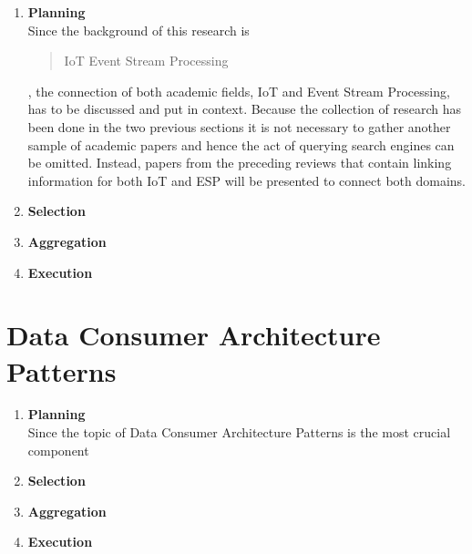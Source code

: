 \begin{enumerate}
    \item
    \textbf{Planning}\\
    Since the background of this research is \blockquote{IoT Event Stream Processing}, the connection of both academic fields, IoT and Event Stream Processing, has to be discussed and put in context. Because the collection of research has been done in the two previous sections it is not necessary to gather another sample of academic papers and hence the act of querying search engines can be omitted. Instead, papers from the preceding reviews that contain linking information for both IoT and ESP will be presented to connect both domains.
    
    \item
    \textbf{Selection}\\
    
    \item
    \textbf{Aggregation}\\
    
    \item
    \textbf{Execution}\\
    
\end{enumerate}


\section{Data Consumer Architecture Patterns}

\begin{enumerate}
    \item
    \textbf{Planning}\\
    Since the topic of Data Consumer Architecture Patterns is the most crucial component 
    
    \item
    \textbf{Selection}\\
    
    \item
    \textbf{Aggregation}\\
    
    \item
    \textbf{Execution}\\
    
\end{enumerate}

